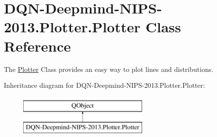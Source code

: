 \hypertarget{classDQN-Deepmind-NIPS-2013_1_1Plotter_1_1Plotter}{}\section{D\+Q\+N-\/\+Deepmind-\/\+N\+I\+P\+S-\/2013.Plotter.\+Plotter Class Reference}
\label{classDQN-Deepmind-NIPS-2013_1_1Plotter_1_1Plotter}


The \hyperlink{classDQN-Deepmind-NIPS-2013_1_1Plotter_1_1Plotter}{Plotter} Class provides an easy way to plot lines and distributions.  


Inheritance diagram for D\+Q\+N-\/\+Deepmind-\/\+N\+I\+P\+S-\/2013.Plotter.\+Plotter\+:\begin{figure}[H]
\begin{center}
\leavevmode
\includegraphics[height=2.000000cm]{classDQN-Deepmind-NIPS-2013_1_1Plotter_1_1Plotter}
\end{center}
\end{figure}
